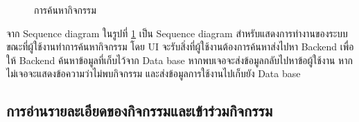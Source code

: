 \documentclass[14pt,oneside,openright,a4paper]{cpe-thai-project}
\begin{document}
  \begin{figure}[!h]\centering
    \setlength{\fboxrule}{0.5mm} %
    \setlength{\fboxsep}{0.5cm}
    \caption{การค้นหากิจกรรม}\label{fig:Search Event}
  \end{figure}

  จาก Sequence diagram ในรูปที่ \ref{fig:Search Event} เป็น Sequence diagram สำหรับแสดงการทำงานของระบบขณะที่ผู้ใช้งานทำการค้นหากิจกรรม โดย UI จะรับสิ่งที่ผู้ใช้งานต้องการค้นหาส่งไปหา Backend เพื่อให้ Backend ค้นหาข้อมูลที่เก็บไว้จาก Data base หากพบเจอจะส่งข้อมูลกลับไปหาข้อผู้ใช้งาน หากไม่เจอจะแสดงข้อความว่าไม่พบกิจกรรม และส่งข้อมูลการใช้งานไปเก็บยัง Data base

\newpage

\subsection{การอ่านรายละเอียดของกิจกรรมและเข้าร่วมกิจกรรม}
\end{document}
